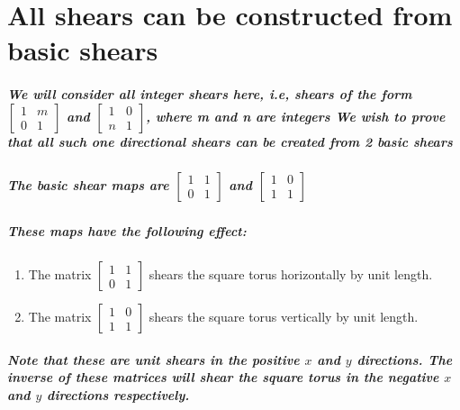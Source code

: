 \documentclass{report}
\begin{document}
\chapter{All shears can be constructed from basic shears}

\paragraph{We will consider all integer shears here, i.e, shears of the form 
$\begin{bmatrix}
1&m\\0&1
\end{bmatrix}$
and
$\begin{bmatrix}
1&0\\n&1
\end{bmatrix}$,
where m and n are integers
We wish to prove that all such one directional shears can be created from 2 basic shears}


\paragraph{The basic shear maps are 
$\begin{bmatrix}
1&1\\0&1
\end{bmatrix}$
and
$\begin{bmatrix}
1&0\\1&1
\end{bmatrix}$
}

\paragraph{These maps have the following effect:}

\begin{enumerate}
\item  {The matrix
$\begin{bmatrix}
1&1\\0&1
\end{bmatrix}$
shears the square torus 
horizontally by unit length.
}

\item  {The matrix
$\begin{bmatrix}
1&0\\1&1
\end{bmatrix}$
shears the square torus vertically 
by unit length.
}
\end{enumerate}

\paragraph{Note that these are unit shears in the positive $x$ and $y$ directions. The inverse of these matrices will shear the square torus in the negative $x$ and $y$ directions respectively.}
\end{document}

